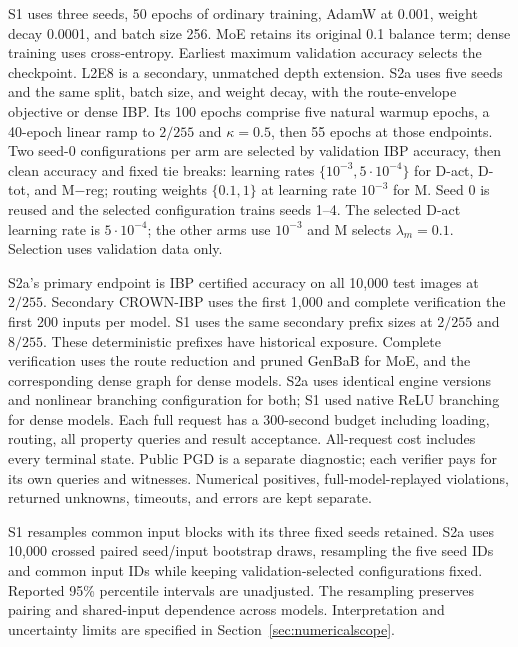 \documentclass[10pt]{article}
\begin{document}
S1 uses three seeds, 50 epochs of ordinary training, AdamW at 0.001,
weight decay 0.0001, and batch size 256. MoE retains its original 0.1 balance
term; dense training uses cross-entropy. Earliest maximum validation accuracy
selects the checkpoint. L2E8 is a secondary, unmatched depth extension.
S2a uses five seeds and the same split, batch size, and weight
decay, with the route-envelope objective or dense IBP. Its 100 epochs comprise
five natural warmup epochs, a 40-epoch linear ramp to $2/255$ and
$\kappa=0.5$, then 55 epochs at those endpoints. Two seed-0 configurations
per arm are selected by validation IBP accuracy, then clean accuracy and
fixed tie breaks: learning rates $\{10^{-3},5\cdot10^{-4}\}$ for D-act,
D-tot, and M$-$reg; routing weights $\{0.1,1\}$ at learning rate $10^{-3}$
for M. Seed 0 is reused and the selected configuration trains seeds 1--4.
The selected D-act learning rate is $5\cdot10^{-4}$; the other arms use
$10^{-3}$ and M selects $\lambda_m=0.1$. Selection uses validation data only.

S2a's primary endpoint is IBP certified accuracy on all 10,000 test images
at $2/255$. Secondary CROWN-IBP uses the first 1,000 and complete verification
the first 200 inputs per model. S1 uses the same secondary prefix sizes at
$2/255$ and $8/255$. These deterministic prefixes have historical exposure.
Complete verification uses the route reduction
and pruned GenBaB for MoE, and the corresponding dense graph for dense models.
S2a uses identical engine versions and nonlinear branching configuration for
both; S1 used native ReLU branching for dense models. Each full request has a
300-second budget including loading, routing, all property queries and result
acceptance. All-request cost includes every terminal state. Public PGD is a
separate diagnostic; each verifier pays for its own queries and witnesses.
Numerical positives, full-model-replayed violations, returned unknowns,
timeouts, and errors are kept separate.

S1 resamples common input blocks with its three fixed seeds retained. S2a
uses 10,000 crossed paired seed/input bootstrap draws, resampling the five
seed IDs and common input IDs while keeping validation-selected configurations
fixed. Reported 95\% percentile intervals are unadjusted. The resampling
preserves pairing and shared-input dependence across models. Interpretation
and uncertainty limits are specified in Section~\ref{sec:numericalscope}.
\end{document}
